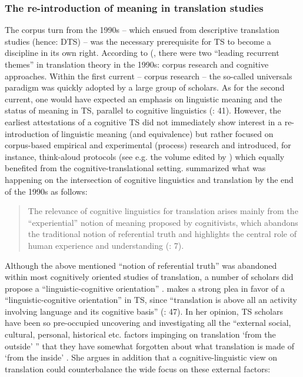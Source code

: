 \subsubsection{\label{sec:2.2.3.2}  The re-introduction of meaning in translation studies}

The corpus turn from the 1990s – which ensued from descriptive translation studies (hence: DTS) – was the necessary prerequisite for TS to become a discipline in its own right. According to (\citet[41]{thelen_translation_2002}, there were two “leading recurrent themes” in translation theory in the 1990s: corpus research and cognitive approaches. Within the first current – corpus research – the so-called universals paradigm was quickly adopted by a large group of scholars. As for the second current, one would have expected an emphasis on linguistic meaning and the status of meaning in TS, parallel to cognitive linguistics (\citealt{thelen_translation_2002}: 41). However, the earliest attestations of a cognitive TS did not immediately show interest in a re-introduction of linguistic meaning (and equivalence) but rather focused on corpus-based empirical and experimental (process) research and introduced, for instance, think-aloud protocols (see e.g. the volume edited by \citealt{tirkkonen-condit_tapping_2000}) which equally benefited from the cognitive-translational setting. \citet{rojo_cognitive_2013} summarized what was happening on the intersection of cognitive linguistics and translation by the end of the 1990s as follows:


\begin{quote}
The relevance of cognitive linguistics for translation arises mainly from the “experiential” notion of meaning proposed by cognitivists, which abandons the traditional notion of referential truth and highlights the central role of human experience and understanding (\citealt{rojo_cognitive_2013}: 7).
\end{quote}


Although the above mentioned “notion of referential truth” was abandoned within most cognitively oriented studies of translation, a number of scholars did propose a “linguistic-cognitive orientation” \citep{house_towards_2013}. \citet{house_towards_2013} makes a strong plea in favor of a “linguistic-cognitive orientation” in TS, since “translation is above all an activity involving language and its cognitive basis” (\citealt{house_towards_2013}: 47). In her opinion, TS scholars have been so pre-occupied uncovering and investigating all the “external social, cultural, personal, historical etc. factors impinging on translation ‘from the outside’ ” that they have somewhat forgotten about what translation is made of ‘from the inside’ \citep[47]{house_towards_2013}. She argues in addition that a cognitive-linguistic view on translation could counterbalance the wide focus on these external factors:


